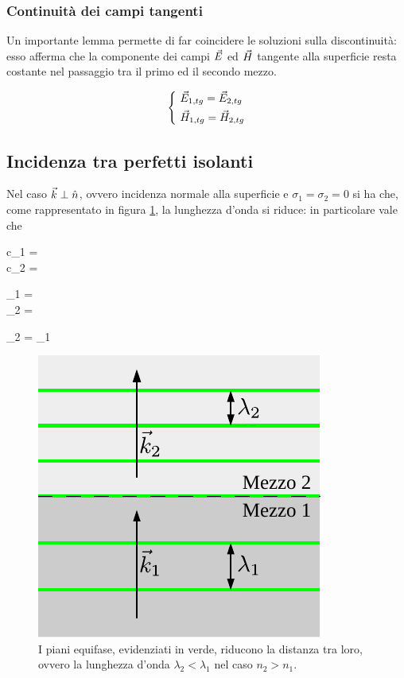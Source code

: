 \subsubsection{Continuità dei campi tangenti}
Un importante lemma permette di far coincidere le soluzioni sulla discontinuità: esso afferma che la componente dei campi $\vec{E}$ ed $\vec{H}$ tangente alla superficie resta costante nel passaggio tra il primo ed il secondo mezzo.

\begin{equation}
	\begin{dcases}
		~ \vec{E}_{1, tg} = \vec{E}_{2, tg} \\
		~ \vec{H}_{1, tg} = \vec{H}_{2, tg}
	\end{dcases}
\end{equation}

\subsection{Incidenza tra perfetti isolanti}
	Nel caso $\vec{k} \perp \hat{n}$, ovvero incidenza normale alla superficie e $\sigma_1 = \sigma_2 = 0$ si ha che, come rappresentato in figura \ref{fig:incidenza_normale_isolanti}, la lunghezza d'onda si riduce: in particolare vale che

	\begin{esp}
		\begin{dcases}
			c_1 =  \\
			c_2 = 
		\end{dcases}
		\implies
		\begin{dcases}
			\lambda_1 = \frac{\lambda_{_{0}}}{n_1} \\
			\lambda_2 = \frac{\lambda_{_{0}}}{n_2}
		\end{dcases}
		\implies
		\lambda_2 = \lambda_1 
	\end{esp}

	\begin{figure}[ht]
		\centering
		\includegraphics{img/incidenza_normale.pdf}
		\caption{I piani equifase, evidenziati in verde, riducono la distanza tra loro, ovvero la lunghezza d'onda $\lambda_2 < \lambda_1$ nel caso $n_2 > n_1$.}
		\label{fig:incidenza_normale_isolanti}
	\end{figure}

